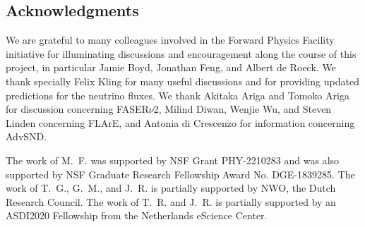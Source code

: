 \subsection*{Acknowledgments}
%
We are grateful to many colleagues involved in the Forward
Physics Facility initiative for illuminating
discussions and encouragement along the course of this project,
in particular Jamie Boyd, Jonathan Feng, and Albert de Roeck.
%
We thank specially Felix Kling for many useful discussions
and for providing updated predictions for the neutrino fluxes.
%
We thank Akitaka Ariga and Tomoko Ariga for discussion
concerning FASER$\nu$2, Milind Diwan,
Wenjie Wu, and Steven Linden concerning FLArE,
and Antonia di Crescenzo for information concerning AdvSND.


The work of M.~F. was supported by NSF Grant PHY-2210283 and was also supported by NSF Graduate Research Fellowship Award No. DGE-1839285.
%
The work of T.~G., G.~M., and J.~R. is partially supported by NWO, the Dutch Research Council.
%
The work of T.~R. and J.~R. is partially supported by an ASDI2020
Fellowship from the Netherlands eScience Center.
